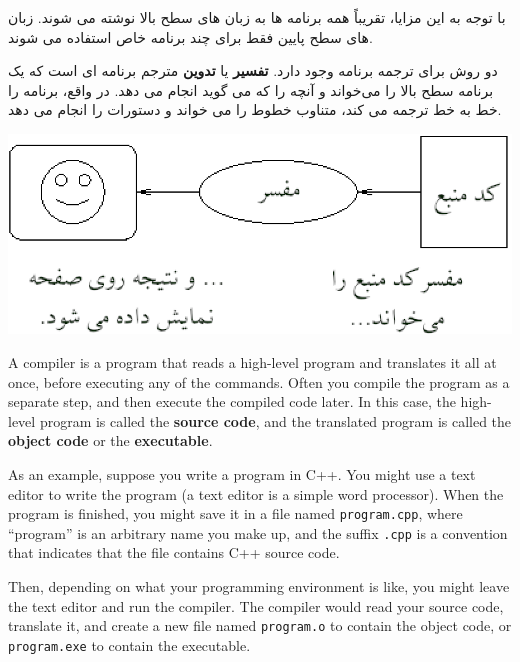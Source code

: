 با توجه به این مزایا، تقریباً همه برنامه ها به زبان های سطح بالا نوشته می شوند. زبان های سطح پایین فقط برای چند برنامه خاص استفاده می شوند.




دو روش برای ترجمه برنامه وجود دارد. \textbf{تفسیر} یا \textbf{تدوین} مترجم برنامه ای است که یک برنامه سطح بالا را می‌خواند و آنچه را که می گوید انجام می دهد. در واقع، برنامه را خط به خط ترجمه می کند، متناوب خطوط را می خواند و دستورات را انجام می دهد.

\vspace{0.1in}
\centering\includegraphics{interpret_fa.eps}
\vspace{0.1in}

A compiler is a program that reads a high-level program and
translates it all at once, before executing any of the commands.
Often you compile the program as a separate step, and then
execute the compiled code later.  In this case, the high-level
program is called the {\bf source code}, and the translated
program is called the {\bf object code} or the {\bf executable}.

As an example, suppose you write a program in C++.  You might
use a text editor to write the program (a text editor is
a simple word processor).  When the program is finished, you
might save it in a file named {\tt program.cpp}, where ``program''
is an arbitrary name you make up, and the suffix {\tt .cpp} is
a convention that indicates that the file contains C++ source
code.

Then, depending on what your programming environment is like,
you might leave the text editor and run the compiler.  The
compiler would read your source code, translate it, and create
a new file named {\tt program.o} to contain the object code,
or {\tt program.exe} to contain the executable. 

